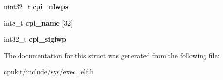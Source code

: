 \begin{DoxyCompactItemize}
uint32\+\_\+t {\bfseries cpi\+\_\+nlwps}
\item 
\mbox{\label{structnetbsd__elfcore__procinfo_adf26150712efedc7a20aa03a5446985d}} 
int8\+\_\+t {\bfseries cpi\+\_\+name} \mbox{[}32\mbox{]}
\item 
\mbox{\label{structnetbsd__elfcore__procinfo_a5bea16788010fc2434b3666f11a787a6}} 
int32\+\_\+t {\bfseries cpi\+\_\+siglwp}
\end{DoxyCompactItemize}


The documentation for this struct was generated from the following file\+:\begin{DoxyCompactItemize}
\item 
cpukit/include/sys/exec\+\_\+elf.\+h\end{DoxyCompactItemize}

